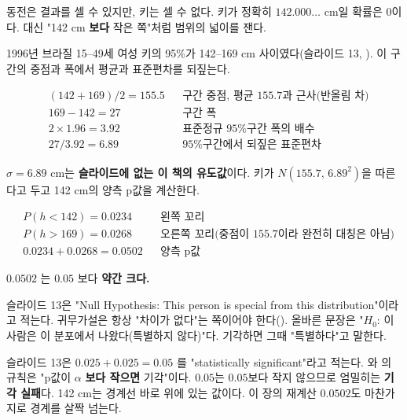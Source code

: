 동전은 결과를 셀 수 있지만, 키는 셀 수 없다. 키가 정확히 $142.000\ldots$
cm일 확률은 $0$이다. 대신 "142 cm \textbf{보다} 작은 쪽"처럼 범위의 넓이를
잰다.

\begin{example}[브라질 여성 키]
\label{ex:pv-height}
1996년 브라질 15--49세 여성 키의 95\%가 142--169 cm 사이였다(슬라이드
13, ). 이 구간의 중점과 폭에서 평균과 표준편차를
되짚는다.

\begin{align*}
  &(142+169)/2 = 155.5 && \text{구간 중점, 평균 155.7과 근사(반올림 차)}\\
  &169-142 = 27 && \text{구간 폭}\\
  &2\times1.96 = 3.92 && \text{표준정규 95\% 구간 폭의 배수}\\
  &27/3.92 = 6.89 && \text{95\% 구간에서 되짚은 표준편차}
\end{align*}

$\sigma=6.89$ cm는 \textbf{슬라이드에 없는 이 책의 유도값}이다. 키가
$N(155.7,\,6.89^2)$을 따른다고 두고 142 cm의 양측 p값을 계산한다.

\begin{align*}
  &P(h<142) = 0.0234 && \text{왼쪽 꼬리}\\
  &P(h>169) = 0.0268 && \text{오른쪽 꼬리(중점이 155.7이라 완전히 대칭은 아님)}\\
  &0.0234+0.0268 = 0.0502 && \text{양측 p값}
\end{align*}

$0.0502$ 는 $0.05$ 보다 \textbf{약간 크다.}
\end{example}

\begin{pitfall}
\label{pit:pv-null-reversed}
슬라이드 13은 "Null Hypothesis: This person is special from this
distribution"이라고 적는다. 귀무가설은 항상 "차이가 없다"는 쪽이어야
한다(). 올바른 문장은 "$H_0$: 이 사람은 이 분포에서
나왔다(특별하지 않다)"다. 기각하면 그때 "특별하다"고 말한다.
\end{pitfall}

\begin{pitfall}[슬라이드는 p = 0.05를 유의하다고 적지만, 바르게는 경계에서
기각 실패다]
슬라이드 13은 $0.025+0.025=0.05$ 를 "statistically significant"라고
적는다. 와 의 규칙은 "p값이 $\alpha$
\textbf{보다 작으면} 기각"이다. $0.05$는 $0.05$보다 작지 않으므로
엄밀히는 \textbf{기각 실패}다. 142 cm는 경계선 바로 위에 있는 값이다. 이
장의 재계산 $0.0502$도 마찬가지로 경계를 살짝 넘는다.
\end{pitfall}

